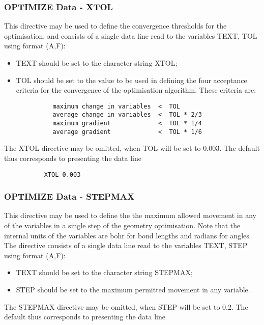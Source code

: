 \documentclass[11pt,fleqn]{article}
\begin{document}
\subsubsection[OPTIMIZE Data - XTOL]{OPTIMIZE Data - XTOL}

This directive may be used to define the convergence thresholds
for the optimisation, and consists of a single data line
read to the variables TEXT, TOL using format (A,F):
\begin{itemize}
\item TEXT should be set to the character string XTOL;
\item TOL should be set to the value to be used in
defining the four acceptance criteria for the convergence of the
optimisation algorithm. These criteria are:

{
\footnotesize
\begin{verbatim}
          maximum change in variables  <  TOL
          average change in variables  <  TOL * 2/3
          maximum gradient             <  TOL * 1/4
          average gradient             <  TOL * 1/6
\end{verbatim}
}
\end{itemize}
The XTOL directive may be omitted, when TOL will be set to 0.003.
The default thus corresponds to presenting the data line

{
\footnotesize
\begin{verbatim}
           XTOL 0.003
\end{verbatim}
}

\subsubsection[OPTIMIZE Data - STEPMAX]{OPTIMIZE Data - STEPMAX}

This directive may be used to define the 
the maximum allowed movement in any of the variables
in a single step of the geometry optimisation. Note that 
the internal units of the variables are
bohr for bond lengths and radians for angles. 
The directive consists of a single data line
read to the variables TEXT, STEP using format (A,F):
\begin{itemize}
\item TEXT should be set to the character string STEPMAX;
\item STEP should be set to the maximum permitted movement
in any variable.
\end{itemize}
The STEPMAX directive may be omitted, when STEP will be set to 0.2.
The default thus corresponds to presenting the data line
\end{document}
